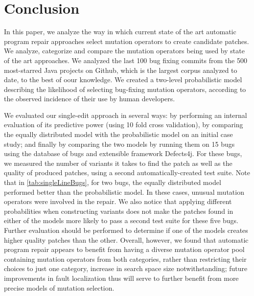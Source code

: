 \documentclass[conference]{IEEEtran}
\begin{document}
\section{Conclusion} \label{conclusion}

In this paper, we analyze the way in which current state of the art automatic 
program repair approaches select mutation operators to create candidate 
patches. We analyze, categorize and compare the mutation operators being used by 
state of the art approaches. We analyzed the last 100 bug fixing commits from the
500 most-starred Java projects on Github, which is the largest corpus analyzed
to date, to the best of oour knowledge.  We created a two-level probabilistic model describing
the likelihood of selecting bug-fixing mutation operators, according to the
observed incidence of their use by human developers. 

We evaluated our single-edit approach in several ways: by performing an internal evaluation of 
its predictive power (using 10 fold cross 
validation), by comparing the equally distributed model with the probabilistic
 model on an initial case study; and finally by comparing the two models 
 by running them on 15 bugs using the database of bugs and extensible 
framework Defects4j. For these bugs, we measured the number of variants it takes to find the 
patch as well as the quality of produced patches, using a second automatically-created test suite.
Note that in \ref{tab:singleLineBugs}, for two bugs,
the equally distributed model performed better than the probabilistic
model. In these cases, unusual mutation operators were involved in the repair. 
We also notice that applying different probabilities when constructing variants
does not make the patches found in either of the models more likely to pass a
second test suite for these five bugs. Further evaluation should be performed to
determine if one of the models creates higher quality patches than the other. 
Overall, however, we found that automatic program repair appears to benefit
from having a diverse mutation operator pool containing mutation operators from both categories,
rather than restricting their choices to just one category, increase in search
space size notwithstanding; future improvements in fault localization thus will
serve to further benefit from more precise models of mutation selection. 
\end{document}
